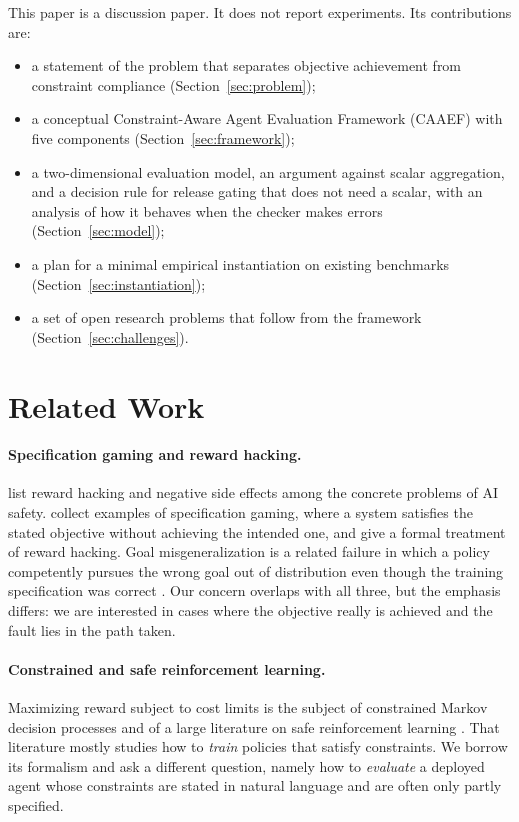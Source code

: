 \documentclass{article}
\begin{document}
This paper is a discussion paper. It does not report experiments. Its contributions are:
\begin{itemize}
    \item a statement of the problem that separates objective achievement from constraint compliance (Section~\ref{sec:problem});
    \item a conceptual Constraint-Aware Agent Evaluation Framework (CAAEF) with five components (Section~\ref{sec:framework});
    \item a two-dimensional evaluation model, an argument against scalar aggregation, and a decision rule for release gating that does not need a scalar, with an analysis of how it behaves when the checker makes errors (Section~\ref{sec:model});
    \item a plan for a minimal empirical instantiation on existing benchmarks (Section~\ref{sec:instantiation});
    \item a set of open research problems that follow from the framework (Section~\ref{sec:challenges}).
\end{itemize}

\section{Related Work}
\label{sec:related}

\paragraph{Specification gaming and reward hacking.}
\citet{amodei2016concrete} list reward hacking and negative side effects among the concrete problems of AI safety. \citet{krakovna2020specification} collect examples of specification gaming, where a system satisfies the stated objective without achieving the intended one, and \citet{skalse2022defining} give a formal treatment of reward hacking. Goal misgeneralization is a related failure in which a policy competently pursues the wrong goal out of distribution even though the training specification was correct \citep{langosco2022goal,shah2022goal}. Our concern overlaps with all three, but the emphasis differs: we are interested in cases where the objective really is achieved and the fault lies in the path taken.

\paragraph{Constrained and safe reinforcement learning.}
Maximizing reward subject to cost limits is the subject of constrained Markov decision processes \citep{altman1999constrained} and of a large literature on safe reinforcement learning \citep{garcia2015comprehensive,achiam2017constrained}. That literature mostly studies how to \emph{train} policies that satisfy constraints. We borrow its formalism and ask a different question, namely how to \emph{evaluate} a deployed agent whose constraints are stated in natural language and are often only partly specified.
\end{document}
